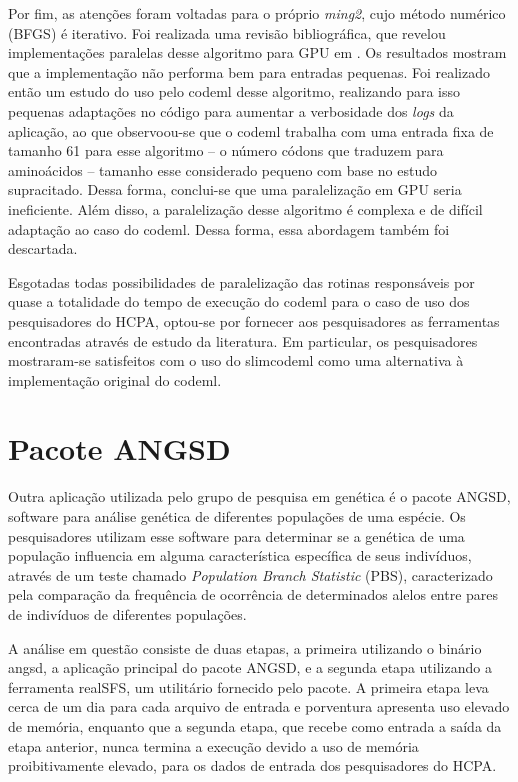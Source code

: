 \documentclass[cic,tc]{iiufrgs}
\begin{document}
Por fim, as atenções foram voltadas para o próprio \textit{ming2}, cujo método
numérico (BFGS) é iterativo. Foi realizada uma revisão bibliográfica, que
revelou implementações paralelas desse algoritmo para GPU em
\cite{fei2014parallel}. Os resultados mostram que a implementação não
performa bem para entradas pequenas. Foi realizado então um estudo do uso pelo
codeml desse algoritmo, realizando para isso pequenas adaptações no código para
aumentar a verbosidade dos \textit{logs} da aplicação, ao que observoou-se  que
o codeml trabalha com uma entrada fixa de tamanho 61 para esse algoritmo -- o
número códons que traduzem para aminoácidos -- tamanho esse considerado pequeno
com base no estudo supracitado. Dessa forma, conclui-se que uma paralelização
em GPU seria ineficiente. Além disso, a paralelização desse algoritmo é
complexa e de difícil adaptação ao caso do codeml. Dessa forma, essa abordagem
também foi descartada.

Esgotadas todas possibilidades de paralelização das rotinas responsáveis por
quase a totalidade do tempo de execução do codeml para o caso de uso dos
pesquisadores do HCPA, optou-se por fornecer aos pesquisadores as ferramentas
encontradas através de estudo da literatura. Em particular, os pesquisadores
mostraram-se satisfeitos com o uso do slimcodeml como uma alternativa à
implementação original do codeml.

\section{Pacote ANGSD}
\label{sec:angsd}

Outra aplicação utilizada pelo grupo de pesquisa em genética é o pacote ANGSD,
software para análise genética de diferentes populações de uma
espécie.\cite{korneliussen2014angsd} Os pesquisadores utilizam esse software
para determinar se a genética de uma população influencia em alguma
característica específica de seus indivíduos, através de um teste chamado
\textit{Population Branch Statistic} (PBS), caracterizado pela comparação da
frequência de ocorrência de determinados alelos entre pares de
indivíduos de diferentes populações.\cite{yi2010sequencing}

A análise em questão consiste de duas etapas, a primeira utilizando o binário
angsd, a aplicação principal do pacote ANGSD, e a segunda etapa utilizando a
ferramenta realSFS, um utilitário fornecido pelo pacote. A primeira etapa leva
cerca de um dia para cada arquivo de entrada e porventura apresenta uso elevado
de memória, enquanto que a segunda etapa, que recebe como entrada a saída da
etapa anterior, nunca termina a execução devido a uso de memória
proibitivamente elevado, para os dados de entrada dos pesquisadores do HCPA.
\end{document}

